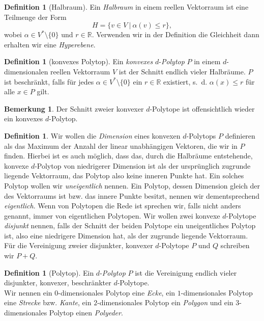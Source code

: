 \documentclass[11pt,titlepage]{article}
\newcommand{\setR}{\mathbb{R}}
\theoremstyle{definition}
\newtheorem{definition}[theorem]{Definition}
\newtheorem{remark}[theorem]{Bemerkung}
\theoremstyle{remark}
\begin{document}
	\begin{definition}[Halbraum]
		Ein \textsl{Halbraum} in einem reellen Vektorraum ist eine Teilmenge 
		der Form
		\[ H= \{ v\in V \  \vert\  \alpha(v)\leq r \}, \]
		wobei $\alpha\in V^*\setminus\{0\}$ und $r\in\setR$. Verwenden 
		wir in der Definition die Gleichheit dann erhalten wir eine
		\textsl{Hyperebene}.
	\end{definition}
	
	\begin{definition}[konvexes Polytop]
		Ein \textsl{konvexes} $d$-\textsl{Polytop} $P$ in einem $d$-dimensionalen reellen Vektorraum $V$ ist der Schnitt endlich vieler 
		Halbräume. $P$ ist beschränkt, falls für jedes $\alpha\in V^*\setminus\{0\}$ ein $r\in \setR$ existiert, s.~d. 
		$\alpha(x)\leq r$ für alle $x\in P$ gilt.
	\end{definition}
	
	\begin{remark}
		Der Schnitt zweier konvexer $d$-Polytope ist offensichtlich wieder ein konvexes $d$-Polytop. 
	\end{remark}

	\begin{definition}
		Wir wollen die \textsl{Dimension} eines konvexen $d$-Polytops $P$ 
		definieren als das 
		Maximum der Anzahl der linear unabhängigen Vektoren, die wir in $P$ finden. 
		Hierbei ist es auch möglich, dass das, durch die Halbräume entstehende, 
		konvexe $d$-Polytop von niedrigerer Dimension ist als der ursprünglich 
		zugrunde liegende Vektorraum, das Polytop also keine inneren Punkte hat. 
		Ein solches Polytop wollen wir \textsl{uneigentlich} nennen. 
		Ein Polytop, dessen 
		Dimension gleich der des Vektorraums ist bzw. das innere Punkte besitzt, 
		nennen wir dementsprechend \textsl{eigentlich}. 
		Wenn von Polytopen die Rede ist 
		sprechen wir, falls nicht anders genannt, immer von eigentlichen Polytopen.
		Wir wollen zwei konvexe $d$-Polytope \textsl{disjunkt} nennen, 
		falls der Schnitt der 
		beiden Polytope ein uneigentliches Polytop ist, also eine niedrigere 
		Dimension hat, als der zugrunde liegende Vektorraum. Für die Vereinigung 
		zweier disjunkter, konvexer $d$-Polytope $P$ und $Q$ schreiben wir $P+Q$.
	\end{definition}
	
	\begin{definition}[Polytop]
		Ein $d$-\textsl{Polytop} $P$ ist die Vereinigung endlich vieler 
		disjunkter, konvexer, beschränkter $d$-Polytope. \\
		Wir nennen ein $0$-dimensionales Polytop eine \textsl{Ecke}, ein 
		$1$-dimensionales Polytop eine \textsl{Strecke} bzw. \textsl{Kante}, ein 
		$2$-dimensionales Polytop ein \textsl{Polygon} und ein 
		$3$-dimensionales Polytop einen \textsl{Polyeder}.
	\end{definition}
	
\end{document}
